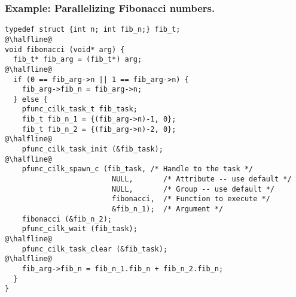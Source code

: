 \documentclass{beamer}
\begin{document}
\begin{frame}[fragile]
\frametitle{Example: Parallelizing Fibonacci numbers.}
\begin{center}
\begin{minipage}{0.75\textwidth}
\begin{lstlisting}
typedef struct {int n; int fib_n;} fib_t;
@\halfline@
void fibonacci (void* arg) {
  fib_t* fib_arg = (fib_t*) arg;
@\halfline@
  if (0 == fib_arg->n || 1 == fib_arg->n) { 
    fib_arg->fib_n = fib_arg->n;
  } else { 
    pfunc_cilk_task_t fib_task;
    fib_t fib_n_1 = {(fib_arg->n)-1, 0};
    fib_t fib_n_2 = {(fib_arg->n)-2, 0};
@\halfline@
    pfunc_cilk_task_init (&fib_task);   
@\halfline@
    pfunc_cilk_spawn_c (fib_task, /* Handle to the task */
                         NULL,       /* Attribute -- use default */
                         NULL,       /* Group -- use default */
                         fibonacci,  /* Function to execute */ 
                         &fib_n_1);  /* Argument */
    fibonacci (&fib_n_2);
    pfunc_cilk_wait (fib_task);
@\halfline@
    pfunc_cilk_task_clear (&fib_task);   
@\halfline@
    fib_arg->fib_n = fib_n_1.fib_n + fib_n_2.fib_n;
  } 
}
\end{lstlisting}
\end{minipage}
\end{center}
\end{frame}
\end{document}
